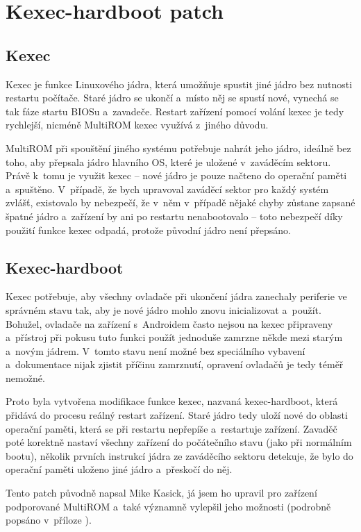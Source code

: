 \documentclass[12pt, a4paper, oneside]{article}
\begin{document}
\section {Kexec-hardboot patch}
\subsection{Kexec}
Kexec je funkce Linuxového jádra, která umožňuje spustit jiné jádro bez nutnosti restartu počítače. Staré jádro se ukončí a~místo něj se spustí nové, vynechá se tak fáze startu BIOSu a~zavadeče. Restart zařízení pomocí volání kexec je tedy rychlejší, nicméně MultiROM kexec využívá z~jiného důvodu.

MultiROM při spouštění jiného systému potřebuje nahrát jeho jádro, ideálně bez toho, aby přepsala jádro hlavního OS, které je uložené v~zaváděcím sektoru. Právě k~tomu je využit kexec -- nové jádro je pouze načteno do operační paměti a~spuštěno. V~případě, že bych upravoval zaváděcí sektor pro každý systém zvlášť, existovalo by nebezpečí, že v~něm v~případě nějaké chyby zůstane zapsané špatné jádro a~zařízení by ani po restartu nenabootovalo -- toto nebezpečí díky použití funkce kexec odpadá, protože původní jádro není přepsáno.

\subsection{Kexec-hardboot}
Kexec potřebuje, aby všechny ovladače při ukončení jádra zanechaly periferie ve správném stavu tak, aby je nové jádro mohlo znovu inicializovat a~použít. Bohužel, ovladače na zařízení s~Androidem často nejsou na kexec připraveny a~přístroj při pokusu tuto funkci použít jednoduše zamrzne někde mezi starým a~novým jádrem. V~tomto stavu není možné bez speciálního vybavení a~dokumentace nijak zjistit příčinu zamrznutí, opravení ovladačů je tedy téměř nemožné.

Proto byla vytvořena modifikace funkce kexec, nazvaná kexec-hardboot, která přidává do procesu reálný restart zařízení. Staré jádro tedy uloží nové do oblasti operační paměti, která se při restartu nepřepíše a~restartuje zařízení. Zavaděč poté korektně nastaví všechny zařízení do počátečního stavu (jako při normálním bootu), několik prvních instrukcí jádra ze zaváděcího sektoru detekuje, že bylo do operační paměti uloženo jiné jádro a~přeskočí do něj.

Tento patch původně napsal Mike Kasick\cite{kexec-hardboot-orig}, já jsem ho upravil pro zařízení podporované MultiROM a~také významně vylepšil jeho možnosti (podrobně popsáno v~příloze ).
\end{document}
